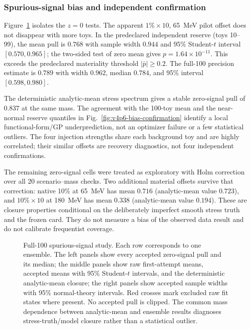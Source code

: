\subsubsection{Spurious-signal bias and independent confirmation}

Figure~\ref{fig:v4p6-zero-signal-spurious} isolates the $z=0$ tests.  The apparent
$1\%\times10$, 65~MeV pilot offset does not disappear with more toys.  In the
predeclared independent reserve (toys 10--99), the mean pull is
$0.768$ with sample width $0.944$ and 95\% Student-$t$ interval
$[0.570,0.965]$; the two-sided test of zero mean gives
$p=1.64\times10^{-11}$.  This exceeds the predeclared materiality threshold
$|\bar p|\geq0.2$.  The full-100 precision estimate is
$0.789$ with width $0.962$, median $0.784$, and 95\% interval
$[0.598,0.980]$.

The deterministic analytic-mean stress spectrum gives a stable zero-signal pull of
$0.837$ at the same mass.  The agreement with the 100-toy mean and the near-normal
reserve quantiles in Fig.~\ref{fig:v4p6-bias-confirmation} identify a local
functional-form/GP underprediction, not an optimizer failure or a few statistical
outliers.  The four injection strengths share each background toy and are highly
correlated; their similar offsets are recovery diagnostics, not four independent
confirmations.

The remaining zero-signal cells were treated as exploratory with Holm correction over
all 20 scenario--mass checks.  Two additional material offsets survive that correction:
native 10\% at 65~MeV has mean $0.716$ (analytic-mean value $0.723$), and
$10\%\times10$ at 180~MeV has mean $0.338$ (analytic-mean value $0.194$).
These are closure properties conditional on the deliberately imperfect smooth stress
truth and the frozen card.  They do not measure a bias of the observed data result and
do not calibrate frequentist coverage.

\begin{figure}[p]
\centering
{}
\caption{Full-100 spurious-signal study.  Each row corresponds to one ensemble.  The
left panels show every accepted zero-signal pull and its median; the middle panels show
raw first-attempt means, accepted means with 95\% Student-$t$ intervals, and the
deterministic analytic-mean closure; the right panels show accepted sample widths with
95\% normal-theory intervals.  Red crosses mark excluded raw fit states where present.
No accepted pull is clipped.  The common mass dependence between analytic-mean and
ensemble results diagnoses stress-truth/model closure rather than a statistical
outlier.}
\label{fig:v4p6-zero-signal-spurious}
\end{figure}

